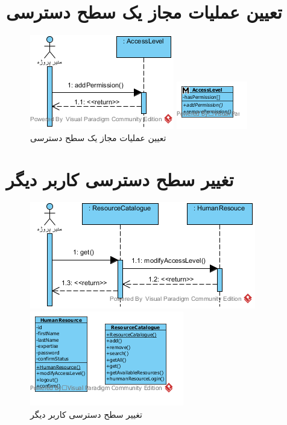 \section{تعیین عملیات مجاز یک سطح دسترسی}
\begin{figure}[H]
	\centering
	\includegraphics[scale=1]{img/sequence-analysis/SetPermissions}
	
	
	\includegraphics[scale=1]{img/sequence-analysis/SetPermissionsC}
	\caption{تعیین عملیات مجاز یک سطح دسترسی}
\end{figure}


\section{تغییر سطح دسترسی کاربر دیگر}
\begin{figure}[H]
	\centering
	\includegraphics[scale=0.7]{img/sequence-analysis/ChangeAccessLevel}
	
	
	\includegraphics[scale=0.7]{img/sequence-analysis/ChangeAccessLevelC}
	\caption{تغییر سطح دسترسی کاربر دیگر}
\end{figure}


